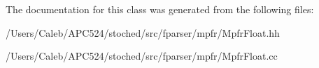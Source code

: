 The documentation for this class was generated from the following files\+:\begin{DoxyCompactItemize}
\item 
/\+Users/\+Caleb/\+A\+P\+C524/stoched/src/fparser/mpfr/Mpfr\+Float.\+hh\item 
/\+Users/\+Caleb/\+A\+P\+C524/stoched/src/fparser/mpfr/Mpfr\+Float.\+cc\end{DoxyCompactItemize}
